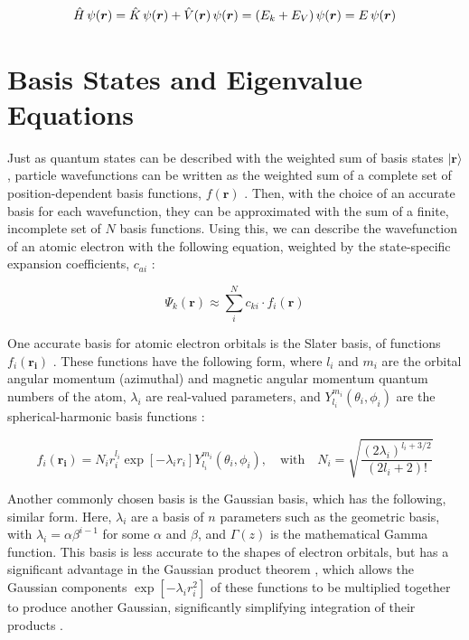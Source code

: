 \begin{equation}
\hat{H}\thinspace\psi(\boldsymbol{r})=\hat{K}\thinspace\psi(\boldsymbol{r})+\hat{V}(\boldsymbol{r})\thinspace\psi(\boldsymbol{r})=(E_k+E_V)\thinspace\psi(\boldsymbol{r})=E\thinspace\psi(\boldsymbol{r})
\end{equation}


\section{Basis States and Eigenvalue Equations}\label{sec:basisstates}

Just as quantum states can be described with the weighted sum of basis states $|\boldsymbol{r}\rangle$, particle wavefunctions can be written as the weighted sum of a complete set of position-dependent basis functions, $f(\boldsymbol{r})$ \cite{quiney_art_nodate}. Then, with the choice of an accurate basis for each wavefunction, they can be approximated with the sum of a finite, incomplete set of $N$ basis functions. Using this, we can describe the wavefunction of an atomic electron with the following equation, weighted by the state-specific expansion coefficients, $c_{ai}$ \cite{quiney_art_nodate}:

\begin{equation}\label{eq:Wavefunction}
\Psi_k(\boldsymbol{r})\approx\sum_{i}^{N} c_{ki} \cdot f_i(\boldsymbol{r})
\end{equation}

One accurate basis for atomic electron orbitals is the Slater basis, of functions $f_i(\boldsymbol{r_i})$ \cite{quiney_art_nodate}. These functions have the following form, where $l_i$ and $m_i$ are the orbital angular momentum (azimuthal) and magnetic angular momentum quantum numbers of the atom, $\lambda_i$ are real-valued parameters, and $Y_{l_i}^{m_i}(\theta_i,\phi_i)$ are the spherical-harmonic basis functions \cite{dai_spherical_2013}:

\begin{equation}\label{eq:Slater}
f_i(\boldsymbol{r_i})=N_ir_i^{l_i}\exp[-\lambda_ir_i]Y_{l_i}^{m_i}(\theta_i,\phi_i), \quad \mathrm{with} \quad N_i=\sqrt{\frac{(2\lambda_i)^{l_i+3/2}}{(2l_i+2)!}}
\end{equation}
\clearpage

Another commonly chosen basis is the Gaussian basis, which has the following, similar form. Here, $\lambda_i$ are a basis of $n$ parameters such as the geometric basis, with $\lambda_i=\alpha\beta^{i-1}$ for some $\alpha$ and $\beta$, and $\Gamma(z)$ is the mathematical Gamma function. This basis is less accurate to the shapes of electron orbitals, but has a significant advantage in the Gaussian product theorem \cite{besalu_general_2011}, which allows the Gaussian components $\exp[-\lambda_ir_i^2]$ of these functions to be multiplied together to produce another Gaussian, significantly simplifying integration of their products \cite{quiney_art_nodate}.

